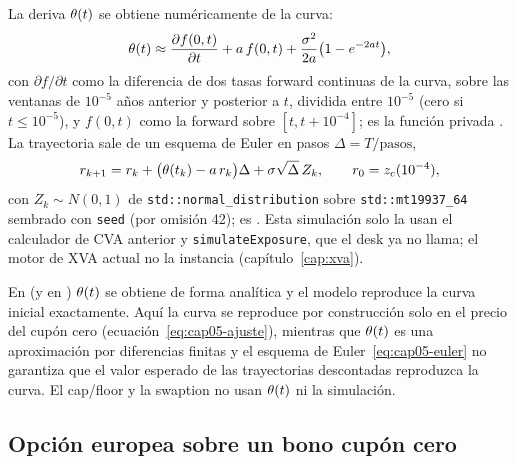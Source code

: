 La deriva $\theta(t)$ se obtiene numéricamente de la curva:
\begin{equation}\label{eq:cap05-theta}
  \theta(t) \approx \frac{\partial f(0,t)}{\partial t} + a\, f(0,t)
  + \frac{\sigma^{2}}{2a}\bigl(1-e^{-2a t}\bigr),
\end{equation}
con $\partial f/\partial t$ como la diferencia de dos tasas forward continuas de la curva, sobre las ventanas
de $10^{-5}$ años anterior y posterior a $t$, dividida entre $10^{-5}$ (cero si $t\le10^{-5}$), y $f(0,t)$ como
la forward sobre $[t,t+10^{-4}]$; es la función privada . La trayectoria
sale de un esquema de Euler en pasos $\Delta=T/\text{pasos}$,
\begin{equation}\label{eq:cap05-euler}
  r_{k+1} = r_k + \bigl(\theta(t_k)-a\, r_k\bigr)\Delta + \sigma\sqrt{\Delta}\,Z_k,\qquad r_0=z_{c}(10^{-4}),
\end{equation}
con $Z_k\sim N(0,1)$ de \texttt{std::normal\_distribution} sobre \texttt{std::mt19937\_64} sembrado con
\texttt{seed} (por omisión 42); es . Esta simulación
solo la usan el calculador de CVA anterior y \texttt{simulateExposure}, que el desk ya no llama; el motor de
XVA actual no la instancia (capítulo~\ref{cap:xva}).

\begin{diferencia}
  En \citet{hull1990} (y en \citealp[cap.~3]{brigo2006}) $\theta(t)$
  se obtiene de forma analítica y el modelo reproduce la curva inicial exactamente. Aquí la curva se
  reproduce por construcción solo en el precio del cupón cero (ecuación~\eqref{eq:cap05-ajuste}), mientras
  que $\theta(t)$ es una aproximación por diferencias finitas y el esquema de Euler~\eqref{eq:cap05-euler} no
  garantiza que el valor esperado de las trayectorias descontadas reproduzca la curva. El cap/floor y la
  swaption no usan $\theta(t)$ ni la simulación.
\end{diferencia}

\subsection{Opción europea sobre un bono cupón cero}\label{sec:cap05-opcion-bono}

